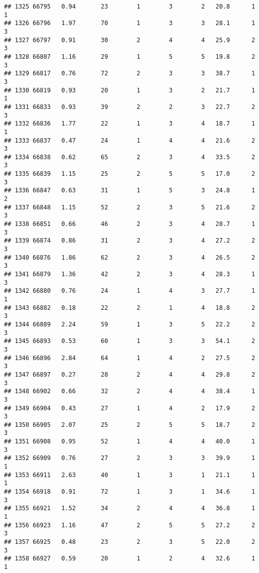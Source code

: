 \documentclass[
]{article}
\begin{document}
\begin{verbatim}
## 1325 66795   0.94       23        1        3        2   20.8      1      1
## 1326 66796   1.97       70        1        3        3   28.1      1      3
## 1327 66797   0.91       30        2        4        4   25.9      2      3
## 1328 66807   1.16       29        1        5        5   19.8      2      3
## 1329 66817   0.76       72        2        3        3   38.7      1      3
## 1330 66819   0.93       20        1        3        2   21.7      1      1
## 1331 66833   0.93       39        2        2        3   22.7      2      3
## 1332 66836   1.77       22        1        3        4   18.7      1      1
## 1333 66837   0.47       24        1        4        4   21.6      2      3
## 1334 66838   0.62       65        2        3        4   33.5      2      3
## 1335 66839   1.15       25        2        5        5   17.0      2      3
## 1336 66847   0.63       31        1        5        3   24.8      1      2
## 1337 66848   1.15       52        2        3        5   21.6      2      3
## 1338 66851   0.66       46        2        3        4   28.7      1      3
## 1339 66874   0.86       31        2        3        4   27.2      2      3
## 1340 66876   1.86       62        2        3        4   26.5      2      3
## 1341 66879   1.36       42        2        3        4   28.3      1      3
## 1342 66880   0.76       24        1        4        3   27.7      1      1
## 1343 66882   0.18       22        2        1        4   18.8      2      3
## 1344 66889   2.24       59        1        3        5   22.2      2      3
## 1345 66893   0.53       60        1        3        3   54.1      2      3
## 1346 66896   2.84       64        1        4        2   27.5      2      3
## 1347 66897   0.27       28        2        4        4   29.8      2      3
## 1348 66902   0.66       32        2        4        4   38.4      1      3
## 1349 66904   0.43       27        1        4        2   17.9      2      3
## 1350 66905   2.07       25        2        5        5   18.7      2      3
## 1351 66908   0.95       52        1        4        4   40.0      1      3
## 1352 66909   0.76       27        2        3        3   39.9      1      1
## 1353 66911   2.63       40        1        3        1   21.1      1      1
## 1354 66918   0.91       72        1        3        1   34.6      1      3
## 1355 66921   1.52       34        2        4        4   36.8      1      1
## 1356 66923   1.16       47        2        5        5   27.2      2      3
## 1357 66925   0.48       23        2        3        5   22.0      2      3
## 1358 66927   0.59       20        1        2        4   32.6      1      1

\end{verbatim}
\end{document}
